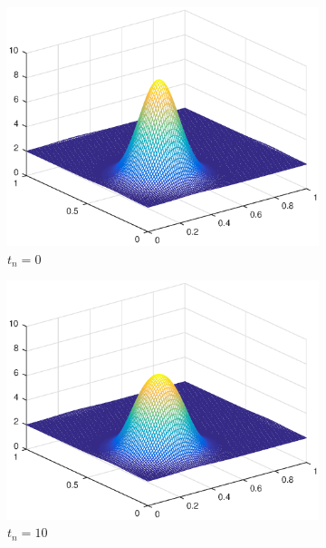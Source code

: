 \begin{figure}[h!]
    \centering
    \begin{subfigure}[t]{0.48\textwidth}
        \centering
        \includegraphics[width=\textwidth]{images/sol_ds_0000.eps}
        \caption{$t_{n}=0$}
        \label{fig:0}
    \end{subfigure}
    \begin{subfigure}[t]{0.48\textwidth}
        \centering
        \includegraphics[width=\textwidth]{images/sol_ds_0010.eps}
        \caption{$t_{n}=10$}
        \label{fig:10}
    \end{subfigure}
    \begin{subfigure}[t]{0.48\textwidth}

\end{subfigure}
\end{figure}
